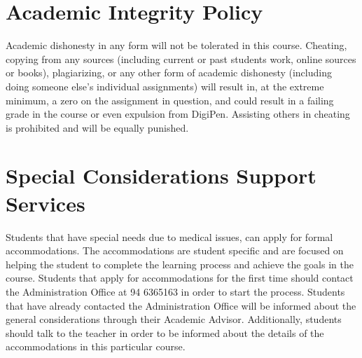 \documentclass[12pt]{article}
\begin{document}
\section*{Academic Integrity Policy}

Academic dishonesty in any form will not be tolerated in this course. Cheating, copying from any sources (including current or past students work, online sources 
or books), plagiarizing, or any other form of academic dishonesty (including doing someone else’s individual assignments) will result in, at the extreme minimum,
 a zero on the assignment in question, and could result in a failing grade in the course or even expulsion from DigiPen. Assisting others in cheating is prohibited 
 and will be equally punished.

\section*{ Special Considerations Support Services}
Students that have special needs due to medical issues, can apply for formal accommodations. 
The accommodations are student specific and are focused on helping the student to complete the learning 
process and achieve the goals in the course. Students that apply for accommodations for the first time should 
contact the Administration Office at 94 6365163 in order to start the process. Students that have already contacted the 
Administration Office will be informed about the general considerations through their Academic Advisor. Additionally, 
students should talk to the teacher in order to be informed about the details of the accommodations in this particular course.







\end{document}
